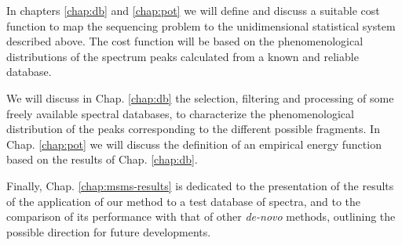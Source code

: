 In chapters \ref{chap:db} and \ref{chap:pot} we will define and discuss a suitable 
cost function to map the sequencing problem
to the unidimensional statistical system described above.
The cost function will be based on the phenomenological distributions of the spectrum peaks
calculated from a known and reliable database. 

We will discuss in Chap. \ref{chap:db} the selection, filtering and processing
of some freely available spectral databases, to characterize the
phenomenological distribution of the peaks corresponding to the different
possible fragments.
In Chap. \ref{chap:pot} we will discuss the definition of an empirical energy
function based on the results of Chap. \ref{chap:db}.

Finally, Chap. \ref{chap:msms-results} is dedicated to the presentation of the
results of the application of our method to a test database of spectra, and to
the comparison of its performance with that of other \emph{de-novo} methods,
outlining the possible direction for future developments.



